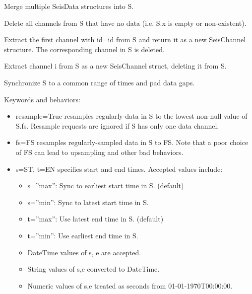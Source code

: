 \documentclass[letterpaper,11pt,english]{sphinxmanual}
\begin{document}
Merge multiple SeisData structures into S.


\begin{fulllineitems}
\end{fulllineitems}


Delete all channels from S that have no data (i.e. S.x is empty or non-existent).

\begin{fulllineitems}
\label{\detokenize{src/Processing/processing:pull}}
\end{fulllineitems}


Extract the first channel with id=id from S and return it as a new SeisChannel structure. The corresponding channel in S is deleted.


\begin{fulllineitems}
\end{fulllineitems}


Extract channel i from S as a new SeisChannel struct, deleting it from S.

Synchronize S to a common range of times and pad data gaps.

Keywords and behaviors:
\begin{itemize}
\item {} 
resample=True resamples regularly-data in S to the lowest non-null value of S.fs. Resample requests are ignored if S has only one data channel.

\item {} 
fs=FS resamples regularly-sampled data in S to FS. Note that a poor choice of FS can lead to upsampling and other bad behaviors.

\item {} 
s=ST, t=EN specifies start and end times. Accepted values include:
\begin{itemize}
\item {} 
s=”max”: Sync to earliest start time in S. (default)

\item {} 
s=”min”: Sync to latest start time in S.

\item {} 
t=”max”: Use latest end time in S. (default)

\item {} 
t=”min”: Use earliest end time in S.

\item {} 
DateTime values of s, e are accepted.

\item {} 
String values of s,e converted to DateTime.

\item {} 
Numeric values of s,e treated as seconds from 01-01-1970T00:00:00.

\end{itemize}

\end{itemize}
\end{document}
